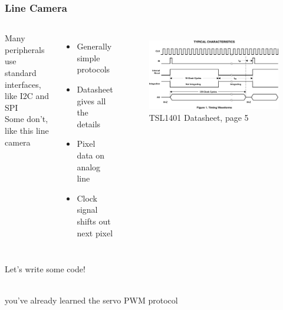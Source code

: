 \documentclass{beamer}
\begin{document}
\begin{frame}
\frametitle{Line Camera}
\begin{columns}[t]
  Many peripherals use standard interfaces, like I2C and SPI \\
  \hfill \break
  Some don't, like this line camera
  \begin{itemize}
    \item Generally simple protocols
    \item Datasheet gives all the details
    \item Pixel data on analog line
    \item Clock signal shifts out next pixel
  \end{itemize}
  \begin{figure}
    \centering
    \includegraphics[width = 0.9\columnwidth]{external/tsl1401-p5-waveforms} \\
    TSL1401 Datasheet, page 5
  \end{figure}
\end{columns}
\end{frame}

\begin{frame}
\centering \huge Let's write some code!
\end{frame}

\begin{frame}
 \\
\hfill \break
you've already learned the servo PWM protocol
\end{frame}
\end{document}
